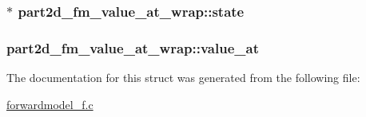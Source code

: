 \subsubsection[{\texorpdfstring{state}{state}}]{$\ast$ part2d\+\_\+fm\+\_\+value\+\_\+at\+\_\+wrap\+::state}\hypertarget{structpart2d__fm__value__at__wrap_af465cf1ca99247852217137fc988947c}{}\label{structpart2d__fm__value__at__wrap_af465cf1ca99247852217137fc988947c}
\subsubsection[{\texorpdfstring{value\+\_\+at}{value_at}}]{ part2d\+\_\+fm\+\_\+value\+\_\+at\+\_\+wrap\+::value\+\_\+at}\hypertarget{structpart2d__fm__value__at__wrap_a1a124ca19ef22647d0fb8c5fb5650f5e}{}\label{structpart2d__fm__value__at__wrap_a1a124ca19ef22647d0fb8c5fb5650f5e}


The documentation for this struct was generated from the following file\+:\begin{DoxyCompactItemize}
\item 
\hyperlink{forwardmodel__f_8c}{forwardmodel\+\_\+f.\+c}\end{DoxyCompactItemize}
